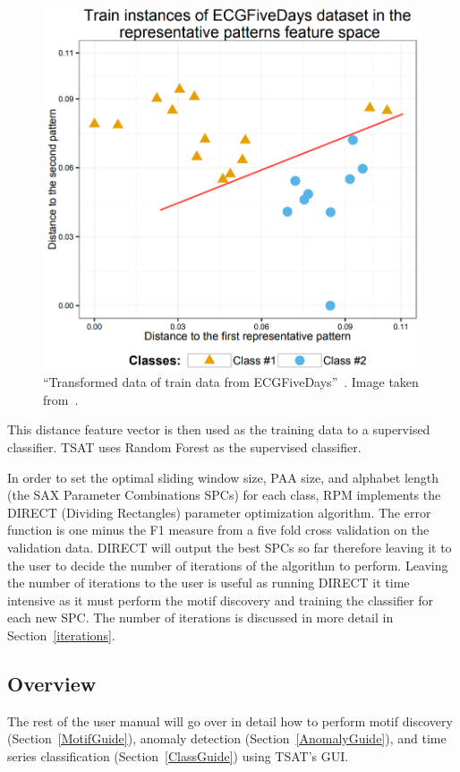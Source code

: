 \documentclass[letterpaper, 12pt]{article}
\begin{document}
\begin{figure}[H]
	\centering
	\includegraphics[width=.7\textwidth]{pictures/featurevec}
	\caption{``Transformed data of train data from ECGFiveDays''~\cite{wang2016rpm}.  Image taken from~\cite{wang2016rpm}.}
	\label{fig:featurevec}
\end{figure}


This distance feature vector is then used as the training data to a supervised classifier. TSAT uses Random Forest as the supervised classifier.

In order to set the optimal sliding window size, PAA size, and alphabet length (the SAX Parameter Combinations SPCs) for each class, RPM implements the DIRECT (Dividing Rectangles) parameter optimization algorithm.  The error function is one minus the F1 measure from a five fold cross validation on the validation data.  DIRECT will output the best SPCs so far therefore leaving it to the user to decide the number of iterations of the algorithm to perform.  Leaving the number of iterations to the user is useful as running DIRECT it time intensive as it must perform the motif discovery and training the classifier for each new SPC.  The number of iterations is discussed in more detail in Section~\ref{iterations}.


\subsection{Overview}

The rest of the user manual will go over in detail how to perform motif discovery (Section~\ref{MotifGuide}), anomaly detection (Section~\ref{AnomalyGuide}), and time series classification (Section~\ref{ClassGuide}) using TSAT's GUI.
\end{document}
